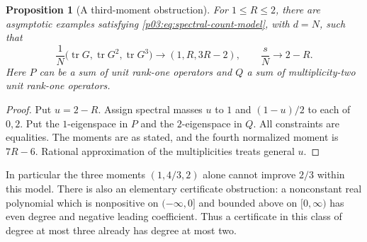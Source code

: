 \documentclass[11pt,letterpaper]{article}
\newtheorem{proposition}[theorem]{Proposition}
\theoremstyle{definition}
\theoremstyle{remark}
\newcommand{\1}{\mathbf 1}
\begin{document}
\begin{proposition}[A third-moment obstruction]\label{p04:prop:frontier-third}
For $1\le R\le2$, there are asymptotic examples satisfying
\eqref{p03:eq:spectral-count-model}, with $d=N$, such that
\[
 \frac1N\bigl(\operatorname{tr}G,
 \operatorname{tr}G^2,\operatorname{tr}G^3\bigr)
 \longrightarrow (1,R,3R-2),
 \qquad \frac{s}{N}\longrightarrow 2-R.
\]
Here $P$ can be a sum of unit rank-one operators and $Q$ a sum of
multiplicity-two unit rank-one operators.
\end{proposition}
\begin{proof}
Put $u=2-R$. Assign spectral masses $u$ to $1$ and $(1-u)/2$ to
each of $0,2$. Put the $1$-eigenspace in $P$ and the $2$-eigenspace
in $Q$. All constraints are equalities. The moments are as stated,
and the fourth normalized moment is $7R-6$. Rational approximation
of the multiplicities treats general $u$.
\end{proof}

In particular the three moments $(1,4/3,2)$ alone cannot improve
$2/3$ within this model. There is also an elementary certificate
obstruction: a nonconstant real polynomial which is nonpositive
on $(-\infty,0]$ and bounded above on $[0,\infty)$ has even degree
and negative leading coefficient. Thus a certificate in this class
of degree at most three already has degree at most two.
\end{document}
